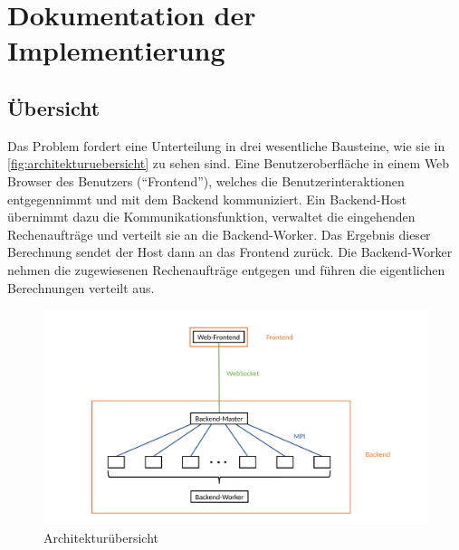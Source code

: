 \section{Dokumentation der Implementierung}







\subsection{Übersicht}

Das Problem fordert eine Unterteilung in drei wesentliche Bausteine, wie sie in \autoref{fig:architekturuebersicht} zu sehen sind.
Eine Benutzeroberfläche in einem Web Browser des Benutzers (“Frontend”), welches die Benutzerinteraktionen entgegennimmt und mit dem Backend kommuniziert.
Ein Backend-Host übernimmt dazu die Kommunikationsfunktion, verwaltet die eingehenden Rechenaufträge und verteilt sie an die Backend-Worker. Das Ergebnis dieser Berechnung sendet der Host dann an das Frontend zurück.
Die Backend-Worker nehmen die zugewiesenen Rechenaufträge entgegen und führen die eigentlichen Berechnungen verteilt aus.

\begin{figure}
	\centering
	\includegraphics[width=0.98\linewidth]{img/Implementierung/Kommunikation.pdf}
	\caption{Architekturübersicht}
	\label{fig:architekturuebersicht}
\end{figure}

